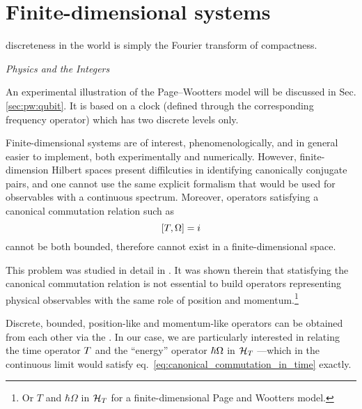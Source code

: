 \section{Finite-dimensional systems}\label{sec:finite-quantum}\label{sec:pw:theory_last}
\epigraph{\textelp{} discreteness in the world is simply the Fourier transform of compactness.}{%
  \emph{Physics and the Integers} \parencite{Tong_Integers}%
}

An experimental illustration of the Page--Wootters model will be discussed in Sec. \ref{sec:pw:qubit}.
It is based on a clock
(defined through the corresponding frequency operator)
which has two discrete levels only.

Finite-dimensional systems are of interest, phenomenologically,
and in general easier to implement,
both experimentally and numerically.
However,
finite-dimension Hilbert spaces
present diffilcuties in identifying canonically conjugate
pairs, and one cannot use the same explicit formalism
that would be used for observables with a continuous spectrum.
Moreover, operators satisfying a canonical
commutation relation such as
\begin{equation}\label{eq:canonical_commutation_in_time}
  [{T}, {\Omega}] = i
\end{equation}
cannot be both bounded, therefore cannot exist in a finite-dimensional space.

This problem was studied in detail in
\cite{FiniteHilb}. It was shown therein
that statisfying the canonical commutation relation 
is not essential to build operators representing physical observables
with the same role of position and momentum.\footnote{
  Or $T$ and $\hbar\Omega$
  in $\mathcal{H}_T$ for a finite-dimensional Page and Wootters model.
}

Discrete, bounded, position-like and momentum-like operators can be obtained from
each other via
the .
In our case, we are particularly interested in relating the
time operator ${T}$ and the ``energy'' operator $\hbar{\Omega}$
in $\mathcal{H}_T$ ---which in the continuous limit would satisfy
eq.~\eqref{eq:canonical_commutation_in_time} exactly.

